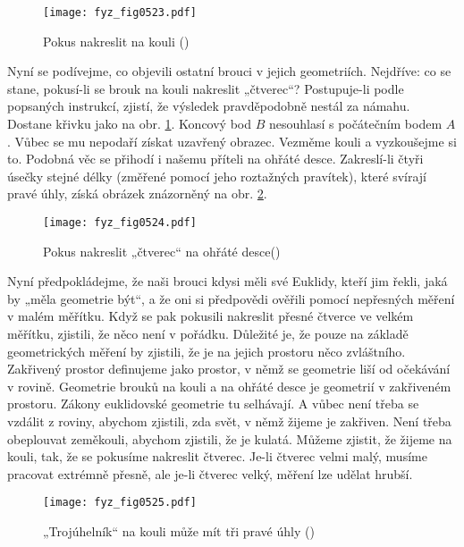    \begin{figure}[ht!] %
      \centering
      \texttt{[image: fyz\_fig0523.pdf]}
      \caption{Pokus nakreslit  na kouli
               (\cite[s.~777]{Feynman02})}
      \label{fyz:fig0523}
    \end{figure}

    Nyní se podívejme, co objevili ostatní brouci v jejich geometriích. Nejdříve: co se stane, 
    pokusí-li se brouk na kouli nakreslit „čtverec“? Postupuje-li podle popsaných instrukcí, 
    zjistí, že výsledek pravděpodobně nestál za námahu. Dostane křivku jako na obr. 
    \ref{fyz:fig0523}. Koncový bod \(B\) nesouhlasí s počátečním bodem \(A\). Vůbec se mu nepodaří 
    získat uzavřený obrazec. Vezměme kouli a vyzkoušejme si to. Podobná věc se přihodí i našemu 
    příteli na ohřáté desce. Zakreslí-li čtyři úsečky stejné délky (změřené pomocí jeho roztažných 
    pravítek), které svírají pravé úhly, získá obrázek znázorněný na obr. \ref{fyz:fig0524}.

    \begin{figure}[ht!] %
      \centering
      \texttt{[image: fyz\_fig0524.pdf]}
      \caption{Pokus nakreslit „čtverec“ na ohřáté desce(\cite[s.~778]{Feynman02})}
      \label{fyz:fig0524}
    \end{figure}
   
    Nyní předpokládejme, že naši brouci kdysi měli své Euklidy, kteří jim řekli, jaká by „měla 
    geometrie být“, a že oni si předpovědi ověřili pomocí nepřesných měření v malém měřítku. Když 
    se pak pokusili nakreslit přesné čtverce ve velkém měřítku, zjistili, že něco není v pořádku. 
    Důležité je, že pouze na základě geometrických měření by zjistili, že je na jejich prostoru 
    něco zvláštního. Zakřivený prostor definujeme jako prostor, v němž se geometrie liší od 
    očekávání v rovině. Geometrie brouků na kouli a na ohřáté desce je geometrií v zakřiveném 
    prostoru. Zákony euklidovské geometrie tu selhávají. A vůbec není třeba se vzdálit z roviny, 
    abychom zjistili, zda svět, v němž žijeme je zakřiven. Není třeba obeplouvat zeměkouli, abychom 
    zjistili, že je kulatá. Můžeme zjistit, že žijeme na kouli, tak, že se pokusíme nakreslit 
    čtverec. Je-li čtverec velmi malý, musíme pracovat extrémně přesně, ale je-li čtverec velký, 
    měření lze udělat hrubší.

    \begin{figure}[ht!] %
      \centering
      \texttt{[image: fyz\_fig0525.pdf]}
      \caption{„Trojúhelník“ na kouli může mít tři pravé úhly (\cite[s.~778]{Feynman02})}
      \label{fyz:fig0525}
    \end{figure}
    
